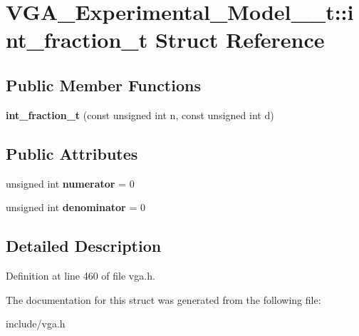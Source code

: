 \hypertarget{structVGA__Experimental__Model__1__t_1_1int__fraction__t}{\section{V\-G\-A\-\_\-\-Experimental\-\_\-\-Model\-\_\-\_\-t\-:\-:int\-\_\-fraction\-\_\-t Struct Reference}
\label{structVGA__Experimental__Model__1__t_1_1int__fraction__t}
}
\subsection*{Public Member Functions}
\begin{DoxyCompactItemize}
\item 
\hypertarget{structVGA__Experimental__Model__1__t_1_1int__fraction__t_a5fcdca938ad48278095a49c341d7ea44}{{\bfseries int\-\_\-fraction\-\_\-t} (const unsigned int n, const unsigned int d)}\label{structVGA__Experimental__Model__1__t_1_1int__fraction__t_a5fcdca938ad48278095a49c341d7ea44}

\end{DoxyCompactItemize}
\subsection*{Public Attributes}
\begin{DoxyCompactItemize}
\item 
\hypertarget{structVGA__Experimental__Model__1__t_1_1int__fraction__t_a2a630246fe159e097cedef1d4b0b2d43}{unsigned int {\bfseries numerator} = 0}\label{structVGA__Experimental__Model__1__t_1_1int__fraction__t_a2a630246fe159e097cedef1d4b0b2d43}

\item 
\hypertarget{structVGA__Experimental__Model__1__t_1_1int__fraction__t_ad683e2a7133851d923075b46b2bf7a86}{unsigned int {\bfseries denominator} = 0}\label{structVGA__Experimental__Model__1__t_1_1int__fraction__t_ad683e2a7133851d923075b46b2bf7a86}

\end{DoxyCompactItemize}


\subsection{Detailed Description}


Definition at line 460 of file vga.\-h.



The documentation for this struct was generated from the following file\-:\begin{DoxyCompactItemize}
\item 
include/vga.\-h\end{DoxyCompactItemize}
